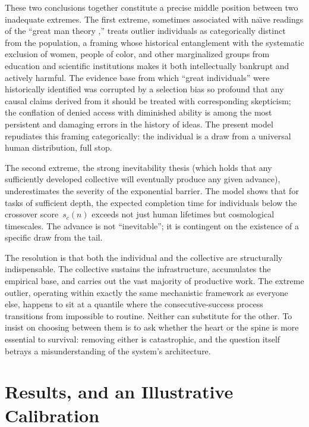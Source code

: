 \documentclass{article}
\begin{document}
\medskip

These two conclusions together constitute a precise middle position
between two inadequate extremes. The first extreme, sometimes associated
with na\"{\i}ve readings of the ``great man theory \cite{hook2004great},'' treats outlier
individuals as categorically distinct from the population, a framing
whose historical entanglement with the systematic exclusion of women,
people of color, and other marginalized groups from education and
scientific institutions makes it both intellectually bankrupt and
actively harmful. The evidence base from which ``great individuals'' were
historically identified was corrupted by a selection bias so profound that
any causal claims derived from it should be treated with corresponding
skepticism; the conflation of denied access with diminished ability is
among the most persistent and damaging errors in the history of ideas.
The present model repudiates this framing categorically: the individual
is a draw from a universal human distribution, full stop.

The second extreme, the strong inevitability thesis (which holds that any
sufficiently developed collective will eventually produce any given
advance), underestimates the severity of the exponential barrier. The
model shows that for tasks of sufficient depth, the expected completion
time for individuals below the crossover score~$s_c(n)$ exceeds not just
human lifetimes but cosmological timescales. The advance is not
``inevitable''; it is contingent on the existence of a specific draw from
the tail.

The resolution is that both the individual and the collective are
structurally indispensable. The collective sustains the infrastructure,
accumulates the empirical base, and carries out the vast majority of
productive work. The extreme outlier, operating within exactly the same
mechanistic framework as everyone else, happens to sit at a quantile where
the consecutive-success process transitions from impossible to routine.
Neither can substitute for the other. To insist on choosing between them
is to ask whether the heart or the spine is more essential to survival:
removing either is catastrophic, and the question itself betrays a
misunderstanding of the system's architecture.



\section{Results, and an Illustrative Calibration}\label{sec:results}
\end{document}
